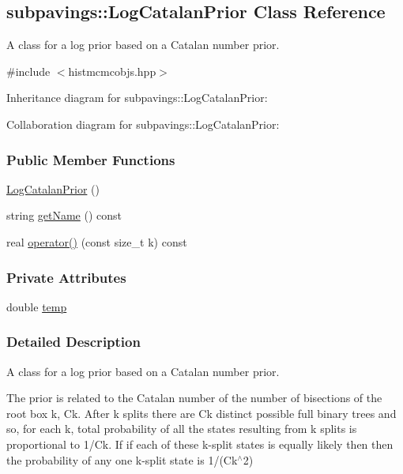 \hypertarget{classsubpavings_1_1LogCatalanPrior}{\subsection{subpavings\-:\-:\-Log\-Catalan\-Prior \-Class \-Reference}
\label{classsubpavings_1_1LogCatalanPrior}
}


\-A class for a log prior based on a \-Catalan number prior.  




{\ttfamily \#include $<$histmcmcobjs.\-hpp$>$}



\-Inheritance diagram for subpavings\-:\-:\-Log\-Catalan\-Prior\-:


\-Collaboration diagram for subpavings\-:\-:\-Log\-Catalan\-Prior\-:
\subsubsection*{\-Public \-Member \-Functions}
\begin{DoxyCompactItemize}
\item 
\hyperlink{classsubpavings_1_1LogCatalanPrior_a2073d1910c1c644561be521b643b5dd9}{\-Log\-Catalan\-Prior} ()
\item 
string \hyperlink{classsubpavings_1_1LogCatalanPrior_add1b40d81d8a22343e74ce7e1a76a354}{get\-Name} () const 
\item 
real \hyperlink{classsubpavings_1_1LogCatalanPrior_a54670df4e881f6516d2e368bee8c2439}{operator()} (const size\-\_\-t k) const 
\end{DoxyCompactItemize}
\subsubsection*{\-Private \-Attributes}
\begin{DoxyCompactItemize}
\item 
double \hyperlink{classsubpavings_1_1LogCatalanPrior_a11e97ab23bba85316c2077491c4c5cac}{temp}
\end{DoxyCompactItemize}


\subsubsection{\-Detailed \-Description}
\-A class for a log prior based on a \-Catalan number prior. 

\-The prior is related to the \-Catalan number of the number of bisections of the root box k, \-Ck. \-After k splits there are \-Ck distinct possible full binary trees and so, for each k, total probability of all the states resulting from k splits is proportional to 1/\-Ck. \-If if each of these k-\/split states is equally likely then then the probability of any one k-\/split state is 1/(\-Ck$^\wedge$2) 

